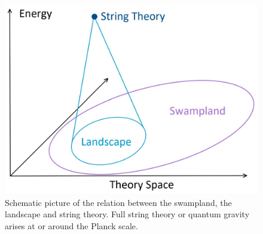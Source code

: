 \documentclass[12pt]{report}
\begin{document}
\begin{figure}[htb]
     \centering
     \includegraphics[scale=0.6]{swamppic.jpg}
     \caption{Schematic picture of the relation between the swampland, the landscape and string theory. Full string theory or quantum gravity arises at or around the Planck scale.}
     \label{fig:swamppic}
\end{figure}
\end{document}
